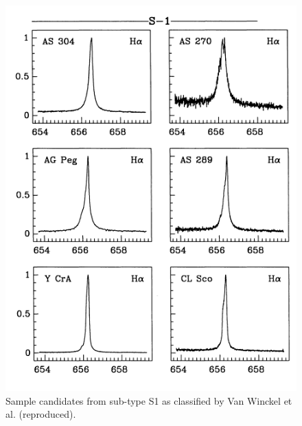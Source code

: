\begin{figure}[!htb]
\centering
\includegraphics[scale=0.75]{figures/van winckel class.png}
\caption{Sample candidates from sub-type S1 as classified by Van Winckel et al. (reproduced).}
\end{figure}

